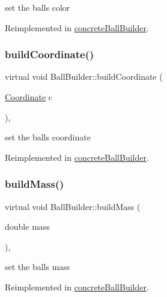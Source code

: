 set the ball\textquotesingle{}s color 

Reimplemented in \mbox{\hyperlink{classconcrete_ball_builder_afec6299653c5c810708254d3e32b6368}{concrete\+Ball\+Builder}}.

\mbox{\label{class_ball_builder_a0ca1344197192ea0f5aa5b7104e5f876}} 
\subsubsection{\texorpdfstring{build\+Coordinate()}{buildCoordinate()}}
{\footnotesize\ttfamily virtual void Ball\+Builder\+::build\+Coordinate (\begin{DoxyParamCaption}\item[{\mbox{\hyperlink{class_coordinate}{Coordinate}}}]{c }\end{DoxyParamCaption})\hspace{0.3cm}{\ttfamily [inline]}, {\ttfamily [virtual]}}

set the ball\textquotesingle{}s coordinate 

Reimplemented in \mbox{\hyperlink{classconcrete_ball_builder_ae4ddab3b62cc22f9f85d9bd3829830c4}{concrete\+Ball\+Builder}}.

\mbox{\label{class_ball_builder_a6514a4ef81d56ba21708783cce473e4e}} 
\subsubsection{\texorpdfstring{build\+Mass()}{buildMass()}}
{\footnotesize\ttfamily virtual void Ball\+Builder\+::build\+Mass (\begin{DoxyParamCaption}\item[{double}]{mass }\end{DoxyParamCaption})\hspace{0.3cm}{\ttfamily [inline]}, {\ttfamily [virtual]}}

set the ball\textquotesingle{}s mass 

Reimplemented in \mbox{\hyperlink{classconcrete_ball_builder_a74b84331ccf45c4880bf3a9bda6bfb22}{concrete\+Ball\+Builder}}.

\mbox{\label{class_ball_builder_af101d6eac3453fd0fda02b8900b49e8f}} 
